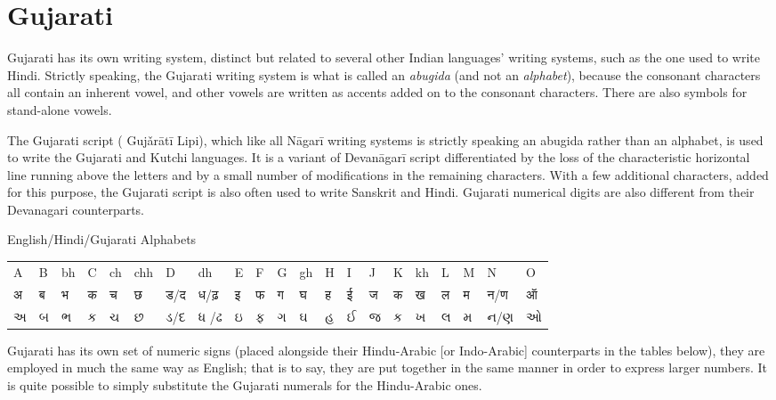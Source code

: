 \section{Gujarati}
\label{s:gujarati}

Gujarati has its own writing system, distinct but related to several other Indian languages' writing systems, such as the one used to write Hindi. Strictly speaking, the Gujarati writing system is what is called an \emph{abugida} (and not an \textit{alphabet}), because the consonant characters all contain an inherent vowel, and other vowels are written as accents added on to the consonant characters. There are also symbols for stand-alone vowels.

The Gujarati script ({} Gujǎrātī Lipi), which like all Nāgarī writing systems is strictly speaking an abugida rather than an alphabet, is used to write the Gujarati and Kutchi languages. It is a variant of Devanāgarī script differentiated by the loss of the characteristic horizontal line running above the letters and by a small number of modifications in the remaining characters.
With a few additional characters, added for this purpose, the Gujarati script is also often used to write Sanskrit and Hindi.
Gujarati numerical digits are also different from their Devanagari counterparts.
\medskip

\bgroup
\newfontfamily{}
\gujarati

\centering

English/Hindi/Gujarati Alphabets

\begin{tabular}{lllllllllllllllllllll}
A &B &bh &C &ch &chh &D &dh &E &F &G &gh &H &I &J &K &kh &L &M &N &O\\

अ &ब &भ &क &च &छ &ड/द &ध/ढ़ &इ &फ &ग &घ &ह &ई &ज &क &ख &ल &म &न/ण &ऑ\\

અ &બ &ભ &ક &ચ &છ &ડ/દ &ધ /ઢ &ઇ &ફ &ગ &ઘ &હ &ઈ &જ &ક &ખ &લ &મ &ન/ણ &ઓ\\

\end{tabular}
\egroup

\medskip

Gujarati has its own set of numeric signs (placed alongside their Hindu-Arabic [or Indo-Arabic] counterparts in the tables below), they are employed in much the same way as English;  that is to say, they are put together in the same manner in order to express larger numbers. It is quite possible to simply substitute the Gujarati numerals for the Hindu-Arabic ones.

